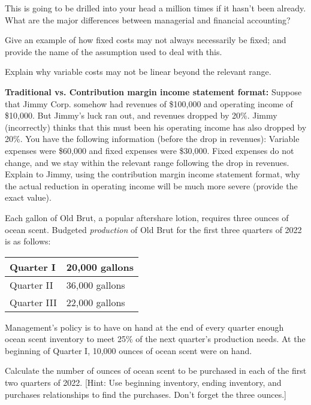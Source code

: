 \documentclass{scrartcl}
\begin{document}
\newpage

This is going to be drilled into your head a million times if it hasn't
been already. What are the major differences between managerial and
financial accounting?

\vspace{10em}

Give an example of how fixed costs may not always necessarily be fixed; and
provide the name of the assumption used to deal with this.

\vspace{10em}

Explain why variable costs may not be linear beyond the relevant range.

\vspace{10em}

\textbf{Traditional vs. Contribution margin income statement format:} 
Suppose that Jimmy Corp. somehow had revenues of \$100,000 and operating
income of \$10,000. But Jimmy's luck ran out, and revenues dropped by
20\%. Jimmy (incorrectly) thinks that this must been his operating
income has also dropped by 20\%. You have the following information
(before the drop in revenues): Variable expenses were \$60,000 and fixed
expenses were \$30,000. Fixed expenses do not change, and we stay
within the relevant range following the drop in revenues. Explain to
Jimmy, using the contribution margin income statement format, why the
actual reduction in operating income will be much more severe (provide
the exact value).

\vspace{10em}

Each gallon of Old Brut, a popular aftershare lotion, requires three 
ounces of ocean scent. Budgeted \emph{production} of Old Brut for the
first three quarters of 2022 is as follows:
\begin{tabular}{|l|l|} \hline
	Quarter I & 20,000 gallons \\ \hline
	Quarter II & 36,000 gallons \\ \hline
	Quarter III & 22,000 gallons \\ \hline
\end{tabular}

Management's policy is to have on hand at the end of every quarter 
enough ocean scent inventory to meet 25\% of the next quarter's 
production needs. At the beginning of Quarter I, 10,000 ounces of
ocean scent were on hand.

\bigskip

Calculate the number of ounces of ocean scent to be purchased in
each of the first two quarters of 2022.
[Hint: Use beginning inventory, ending inventory, and purchases 
relationships to find the purchases. Don't forget the three ounces.]

\vspace{10em}
\end{document}
